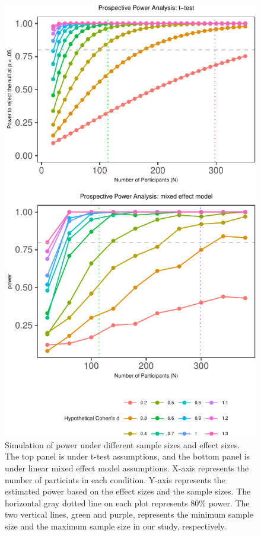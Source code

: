 \documentclass[
  man,floatsintext]{apa6}
\begin{document}
\begin{figure}
\centering
\includegraphics{CCRR_manuscript_files/figure-latex/unnamed-chunk-45-1.pdf}
\caption{\label{fig:unnamed-chunk-45}Simulation of power under different sample sizes and effect sizes. The top panel is under t-test assumptions, and the bottom panel is under linear mixed effect model assumptions. X-axis represents the number of particints in each condition. Y-axis represents the estimated power based on the effect sizes and the sample sizes. The horizontal gray dotted line on each plot represents 80\% power. The two vertical lines, green and purple, represents the minimum sample size and the maximum sample size in our study, respectively.}
\end{figure}
\end{document}
